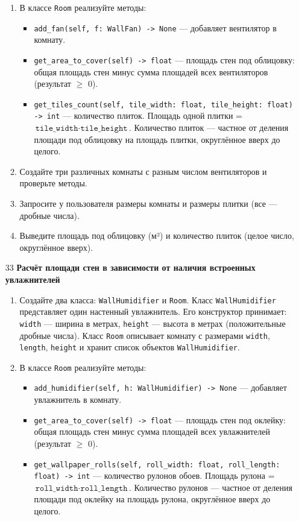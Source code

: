 \begin{enumerate}
\begin{enumerate}
    \item В классе \texttt{Room} реализуйте методы:  
    \begin{itemize}
        \item \texttt{add\_fan(self, f: WallFan) -> None} — добавляет вентилятор в комнату.
        \item \texttt{get\_area\_to\_cover(self) -> float} — площадь стен под облицовку: общая площадь стен минус сумма площадей всех вентиляторов (результат $\geqslant$ 0).
        \item \texttt{get\_tiles\_count(self, tile\_width: float, tile\_height: float) -> int} — количество плиток. Площадь одной плитки = \(\texttt{tile\_width} \cdot \texttt{tile\_height}\). Количество плиток — частное от деления площади под облицовку на площадь плитки, округлённое вверх до целого.
    \end{itemize}

    \item Создайте три различных комнаты с разным числом вентиляторов и проверьте методы.

    \item Запросите у пользователя размеры комнаты и размеры плитки (все — дробные числа).

    \item Выведите площадь под облицовку (м²) и количество плиток (целое число, округлённое вверх).
\end{enumerate}

\item[33] \textbf{Расчёт площади стен в зависимости от наличия встроенных увлажнителей}
\begin{enumerate}
    \item Создайте два класса: \texttt{WallHumidifier} и \texttt{Room}.  
    Класс \texttt{WallHumidifier} представляет один настенный увлажнитель. Его конструктор принимает:  
    \texttt{width} — ширина в метрах,  
    \texttt{height} — высота в метрах (положительные дробные числа).  
    Класс \texttt{Room} описывает комнату с размерами \texttt{width}, \texttt{length}, \texttt{height} и хранит список объектов \texttt{WallHumidifier}.

    \item В классе \texttt{Room} реализуйте методы:  
    \begin{itemize}
        \item \texttt{add\_humidifier(self, h: WallHumidifier) -> None} — добавляет увлажнитель в комнату.
        \item \texttt{get\_area\_to\_cover(self) -> float} — площадь стен под оклейку: общая площадь стен минус сумма площадей всех увлажнителей (результат $\geqslant$ 0).
        \item \texttt{get\_wallpaper\_rolls(self, roll\_width: float, roll\_length: float) -> int} — количество рулонов обоев. Площадь рулона = \(\texttt{roll\_width} \cdot \texttt{roll\_length}\). Количество рулонов — частное от деления площади под оклейку на площадь рулона, округлённое вверх до целого.
    \end{itemize}


\end{enumerate}
\end{enumerate}
